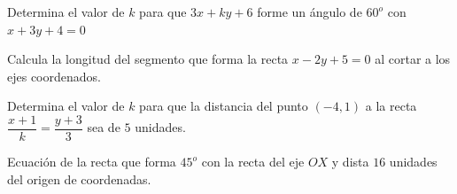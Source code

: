 \begin{mipropuesto}

Determina el valor de $k$ para que $3x+ky+6$ forme un ángulo de $60^o$ con $x+3y+4=0$

\end{mipropuesto}

\vspace{-8mm}
\begin{flushright}
\begin{footnotesize} \textcolor{gris}{}	\end{footnotesize}
\end{flushright}


\begin{mipropuesto}

Calcula la longitud del segmento que forma la recta $x-2y+5=0$ al cortar a los ejes coordenados.

\end{mipropuesto}

\vspace{-8mm}
\begin{flushright}
\begin{tiny} \textcolor{gris}{}	\end{tiny}
\end{flushright}

\begin{mipropuesto}

Determina el valor de $k$ para que la distancia del punto $(-4,1)$ a la recta $\dfrac{x+1}{k}=\dfrac{y+3}{3}$ sea de $5$ unidades.

\end{mipropuesto}

\vspace{-8mm}
\begin{flushright}
\begin{footnotesize} \textcolor{gris}{}	\end{footnotesize}
\end{flushright}


\begin{mipropuesto}

Ecuación de la recta que forma $45^o$ con la recta del eje $OX$ y dista $16$ unidades del origen de coordenadas.

\end{mipropuesto}


